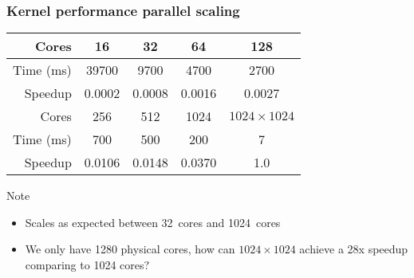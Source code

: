\begin{frame}
  \frametitle{Kernel performance parallel scaling}
  \begin{table}[h]
    \begin{tabular}{rcccc}
      \toprule
      Cores & 16 & 32 & 64 & 128 \\
      \midrule
      Time (ms) & 39700 & 9700 & 4700 & 2700 \\
      Speedup & 0.0002 & 0.0008 & 0.0016 & 0.0027 \\
      \bottomrule
      \toprule
      Cores & 256 & 512 & 1024 & \(1024 \times 1024\)\\
      \midrule
      Time (ms) & 700 & 500 & 200 & 7 \\
      Speedup & 0.0106 & 0.0148 & 0.0370 & 1.0 \\
      \bottomrule
    \end{tabular}
  \end{table}
  \pause{}
  \begin{alertblock}{Note}
    \begin{itemize}
    \item Scales as expected between 32~cores and 1024~cores
    \item We only have 1280 physical cores, how can
      \(1024 \times 1024\) achieve a 28x speedup comparing to 1024 cores?
    \end{itemize}
  \end{alertblock}
\end{frame}

